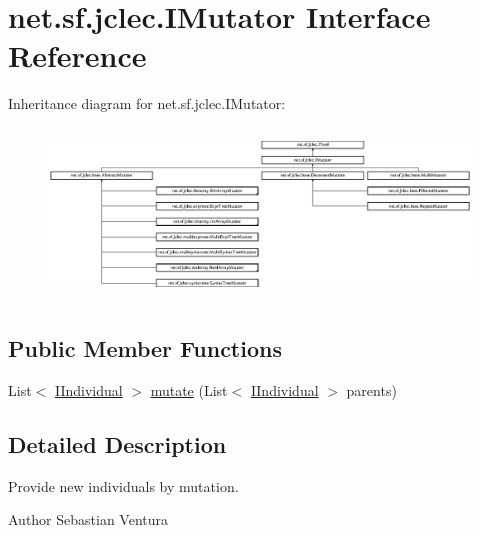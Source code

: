 \hypertarget{interfacenet_1_1sf_1_1jclec_1_1_i_mutator}{\section{net.\-sf.\-jclec.\-I\-Mutator Interface Reference}
\label{interfacenet_1_1sf_1_1jclec_1_1_i_mutator}
}
Inheritance diagram for net.\-sf.\-jclec.\-I\-Mutator\-:\begin{figure}[H]
\begin{center}
\leavevmode
\includegraphics[height=4.560260cm]{interfacenet_1_1sf_1_1jclec_1_1_i_mutator}
\end{center}
\end{figure}
\subsection*{Public Member Functions}
\begin{DoxyCompactItemize}
\item 
List$<$ \hyperlink{interfacenet_1_1sf_1_1jclec_1_1_i_individual}{I\-Individual} $>$ \hyperlink{interfacenet_1_1sf_1_1jclec_1_1_i_mutator_a5300cd0df63950ea9f660b24425211fb}{mutate} (List$<$ \hyperlink{interfacenet_1_1sf_1_1jclec_1_1_i_individual}{I\-Individual} $>$ parents)
\end{DoxyCompactItemize}


\subsection{Detailed Description}
Provide new individuals by mutation.

\begin{DoxyAuthor}{Author}
Sebastian Ventura 
\end{DoxyAuthor}



